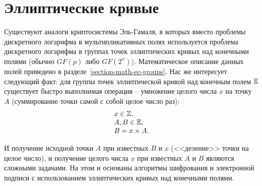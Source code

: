\section{Эллиптические кривые}\label{section-elliptic-curve-cryptosystems}

Существуют аналоги криптосистемы Эль-Гамаля, в которых вместо проблемы дискретного логарифма в мультипликативных полях используется проблема дискретного логарифма в группах точек эллиптических кривых над конечными полями (обычно $GF(p)$ либо $GF(2^n)$). Математическое описание данных полей приведено в разделе~\ref{section-math-ec-groups}. Нас же интересует следующий факт: для группы точек эллиптической кривой над конечным полем $\mathbb{E}$ существует быстро выполнимая операция -- умножение целого числа $x$ на точку $A$ (суммирование точки самой с собой целое число раз):
\[ \begin{array}{l}
	x \in \mathbb{Z}, \\
	A, B \in \mathbb{E}, \\
	B = x \times A. \\
\end{array} \]

И получение исходной точки $A$ при известных $B$ и $x$ (<<деление>> точки на целое число), и получение целого числа $x$ при известных $A$ и $B$ являются сложными задачами. На этом и основаны алгоритмы шифрования и электронной подписи с использованием эллиптических кривых над конечными полями.




